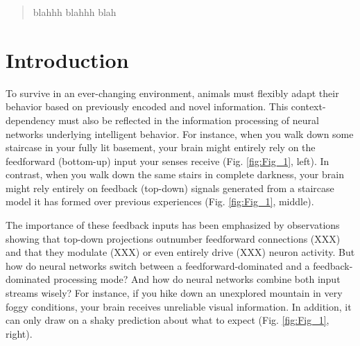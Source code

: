 \documentclass[10pt,a4paper]{article}
\begin{document}
\thispagestyle{empty}

\begin{flushleft}
{\Large
\textbf{}
}

\end{flushleft}


\begin{abstract}
blahhh blahhh blah
\end{abstract}

\section*{Introduction}
%
To survive in an ever-changing environment, animals must flexibly adapt their behavior based on previously encoded and novel information. This context-dependency must also be reflected in the information processing of neural networks underlying intelligent behavior. For instance, when you walk down some staircase in your fully lit basement, your brain might entirely rely on the feedforward (bottom-up) input your senses receive (Fig. \ref{fig:Fig_1}, left). In contrast, when you walk down the same stairs in complete darkness, your brain might rely entirely on feedback (top-down) signals generated from a staircase model it has formed over previous experiences (Fig. \ref{fig:Fig_1}, middle). 

The importance of these feedback inputs has been emphasized by observations showing that top-down projections outnumber feedforward connections (XXX) and that they modulate (XXX) or even entirely drive (XXX) neuron activity. But how do neural networks switch between a feedforward-dominated and a feedback-dominated processing mode? And how do neural networks combine both input streams wisely? For instance, if you hike down an unexplored mountain in very foggy conditions, your brain receives unreliable visual information. In addition, it can only draw on a shaky prediction about what to expect (Fig. \ref{fig:Fig_1}, right). 
\end{document}
